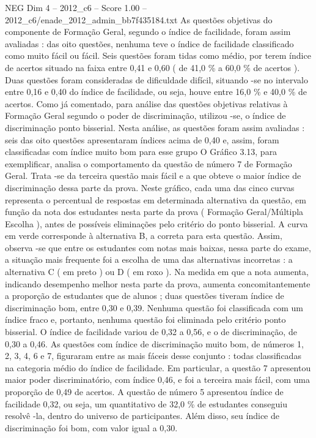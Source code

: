 \begin{textsample}{NEG Dim 4 – 2012\_c6 – Score 1.00 – 2012\_c6/enade\_2012\_admin\_bb7f435184.txt}
As questões objetivas do componente de Formação Geral, segundo o índice de facilidade, foram assim avaliadas : das oito questões, nenhuma teve o índice de facilidade classificado como muito fácil ou fácil.
Seis questões foram tidas como médio, por terem índice de acertos situado na faixa entre 0,41 e 0,60 ( de 41,0 \% a 60,0 \% de acertos ).
Duas questões foram consideradas de dificuldade difícil, situando -se no intervalo entre 0,16 e 0,40 do índice de facilidade, ou seja, houve entre 16,0 \% e 40,0 \% de acertos.
Como já comentado, para análise das questões objetivas relativas à Formação Geral segundo o poder de discriminação, utilizou -se, o índice de discriminação ponto bisserial.
Nesta análise, as questões foram assim avaliadas : seis das oito questões apresentaram índices acima de 0,40 e, assim, foram classificadas com índice muito bom para esse grupo O Gráfico 3.13, para exemplificar, analisa o comportamento da questão de número 7 de Formação Geral.
Trata -se da terceira questão mais fácil e a que obteve o maior índice de discriminação dessa parte da prova.
Neste gráfico, cada uma das cinco curvas representa o percentual de respostas em determinada alternativa da questão, em função da nota dos estudantes nesta parte da prova ( Formação Geral/Múltipla Escolha ), antes de possíveis eliminações pelo critério do ponto bisserial.
A curva em verde corresponde à alternativa B, a correta para esta questão.
Assim, observa -se que entre os estudantes com notas mais baixas, nessa parte do exame, a situação mais frequente foi a escolha de uma das alternativas incorretas : a alternativa C ( em preto ) ou D ( em roxo ).
Na medida em que a nota aumenta, indicando desempenho melhor nesta parte da prova, aumenta concomitantemente a proporção de estudantes que de alunos ; duas questões tiveram índice de discriminação bom, entre 0,30 e 0,39.
Nenhuma questão foi classificada com um índice fraco e, portanto, nenhuma questão foi eliminada pelo critério ponto bisserial.
O índice de facilidade variou de 0,32 a 0,56, e o de discriminação, de 0,30 a 0,46.
As questões com índice de discriminação muito bom, de números 1, 2, 3, 4, 6 e 7, figuraram entre as mais fáceis desse conjunto : todas classificadas na categoria médio do índice de facilidade.
Em particular, a questão 7 apresentou maior poder discriminatório, com índice 0,46, e foi a terceira mais fácil, com uma proporção de 0,49 de acertos.
A questão de número 5 apresentou índice de facilidade 0,32, ou seja, um quantitativo de 32,0 \% de estudantes conseguiu resolvê -la, dentro do universo de participantes.
Além disso, seu índice de discriminação foi bom, com valor igual a 0,30.

\end{textsample}

